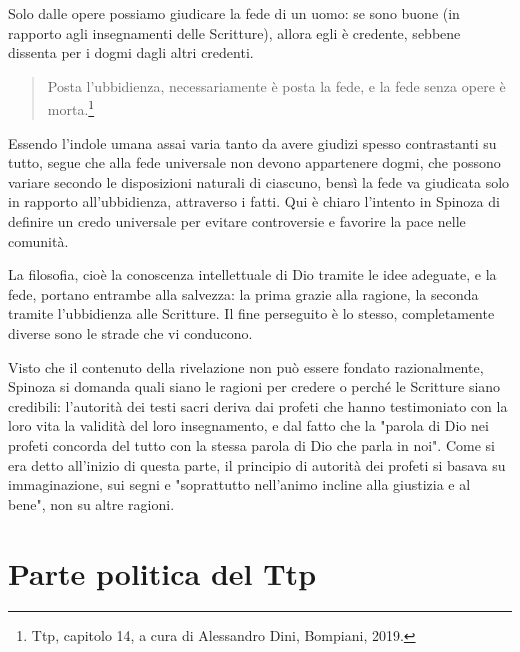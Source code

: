 Solo dalle opere possiamo giudicare la fede di un uomo: se sono buone (in rapporto agli insegnamenti delle Scritture), allora egli è credente, sebbene dissenta per i dogmi dagli altri credenti.

\begin{quotation}
	\small Posta l'ubbidienza, necessariamente è posta la fede, e la fede senza opere è morta.\footnote{Ttp, capitolo 14, a cura di Alessandro Dini, Bompiani, 2019.}
\end{quotation}

Essendo l'indole umana assai varia tanto da avere giudizi spesso contrastanti su tutto, segue che alla fede universale non devono appartenere dogmi, che possono variare secondo le disposizioni naturali di ciascuno, bensì la fede va giudicata solo in rapporto all'ubbidienza, attraverso i fatti. Qui è chiaro l'intento in Spinoza di definire un credo universale per evitare controversie e favorire la pace nelle comunità.

La filosofia, cioè la conoscenza intellettuale di Dio tramite le idee adeguate, e la fede, portano entrambe alla salvezza: la prima grazie alla ragione, la seconda tramite l'ubbidienza alle Scritture. Il fine perseguito è lo stesso, completamente diverse sono le strade che vi conducono.

Visto che il contenuto della rivelazione non può essere fondato razionalmente, Spinoza si domanda quali siano le ragioni per credere  o perché le Scritture siano credibili: l'autorità dei testi sacri deriva dai profeti che hanno testimoniato con la loro vita la validità del loro insegnamento, e dal fatto che la "parola di Dio nei profeti concorda del tutto con la stessa parola di Dio che parla in noi".
Come si era detto all'inizio di questa parte, il principio di autorità dei profeti si basava su immaginazione, sui segni e "soprattutto nell'animo incline alla giustizia e al bene", non su altre ragioni.

\section[Parte politica]{Parte politica del Ttp}


